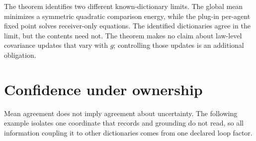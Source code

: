 \documentclass[11pt,letterpaper]{report}
\begin{document}
The theorem identifies two different known-dictionary limits. The global mean minimizes a symmetric quadratic comparison energy, while the plug-in per-agent fixed point solves receiver-only equations. The identified dictionaries agree in the limit, but the contents need not. The theorem makes no claim about law-level covariance updates that vary with $g$; controlling those updates is an additional obligation.

\chapter{Confidence under ownership}
\label{it2:ch-confidence}

Mean agreement does not imply agreement about uncertainty. The following example isolates one coordinate that records and grounding do not read, so all information coupling it to other dictionaries comes from one declared loop factor.
\end{document}
